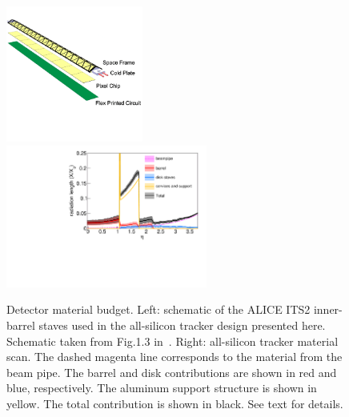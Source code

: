 \begin{figure}[htbp]
    \centering
    \includegraphics[width=0.40\textwidth]{EIC_Jets/alice_its2_stave.jpg}
    \includegraphics[width=0.59\textwidth]{EIC_Jets/mat_scan.pdf}
    \caption{Detector material budget.
    Left: schematic of the ALICE ITS2 inner-barrel staves used in the all-silicon tracker design presented here. Schematic taken from Fig.1.3 in~\cite{Abelevetal:2014dna}.
    Right: all-silicon tracker material scan.
    The dashed magenta line corresponds to the material from the beam pipe.
    The barrel and disk contributions are shown in red and blue, respectively.
    The aluminum support structure is shown in yellow.
    The total contribution is shown in black.
    See text for details.
    }
    \label{fig:material}
\end{figure}

